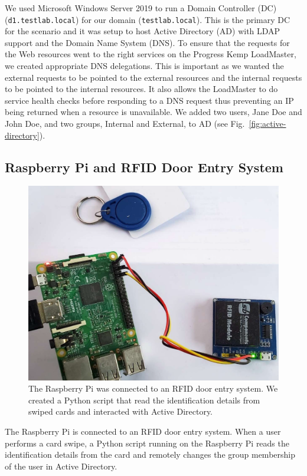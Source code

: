 We used Microsoft Windows Server 2019 to run a Domain Controller (DC)
(\texttt{d1.testlab.local}) for our domain (\texttt{testlab.local}).
This is the primary DC for the scenario and it was setup to host
Active Directory (AD) with LDAP support and the Domain Name System
(DNS).  To ensure that the requests for the Web resources went to the
right services on the Progress Kemp LoadMaster, we created appropriate
DNS delegations. This is important as we wanted the external requests
to be pointed to the external resources and the internal requests to
be pointed to the internal resources.  It also allows the LoadMaster to
do service health checks before responding to a DNS request thus
preventing an IP being returned when a resource is unavailable.  We
added two users, Jane Doe and John Doe, and two groups, Internal and
External, to AD (see Fig.~\ref{fig:active-directory}).

\subsection{Raspberry Pi and RFID Door Entry System}

\begin{figure}
  \centerline{\includegraphics[width=\columnwidth]{img/raspberry-pi-rfid}}
  \caption{The Raspberry Pi was connected to an RFID door entry
    system.  We created a Python script that read the identification
    details from swiped cards and interacted with Active
    Directory.}\label{fig:raspberry-pi-rfid}
\end{figure}

The Raspberry Pi is connected to an RFID door entry system.  When a
user performs a card swipe, a Python script running on the Raspberry
Pi reads the identification details from the card and remotely changes
the group membership of the user in Active Directory.

